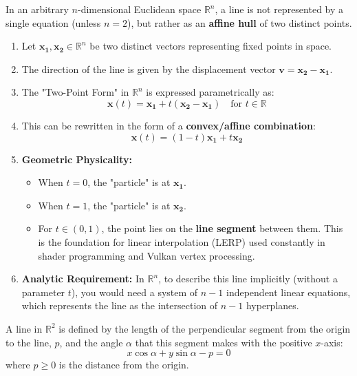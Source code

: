 \begin{remark}
In an arbitrary $n$-dimensional Euclidean space $\mathbb{R}^n$, a line is not represented by a single equation (unless $n=2$), but rather as an \textbf{affine hull} of two distinct points.

\begin{enumerate}
    \item Let $\mathbf{x_1}, \mathbf{x_2} \in \mathbb{R}^n$ be two distinct vectors representing fixed points in space.
    \item The direction of the line is given by the displacement vector $\mathbf{v} = \mathbf{x_2} - \mathbf{x_1}$.
    \item The "Two-Point Form" in $\mathbb{R}^n$ is expressed parametrically as:
    \[ \mathbf{x}(t) = \mathbf{x_1} + t(\mathbf{x_2} - \mathbf{x_1}) \quad \text{for } t \in \mathbb{R} \]
    \item This can be rewritten in the form of a \textbf{convex/affine combination}:
    \[ \mathbf{x}(t) = (1 - t)\mathbf{x_1} + t\mathbf{x_2} \]
    \item \textbf{Geometric Physicality:} 
    \begin{itemize}
        \item When $t=0$, the "particle" is at $\mathbf{x_1}$.
        \item When $t=1$, the "particle" is at $\mathbf{x_2}$.
        \item For $t \in (0, 1)$, the point lies on the \textbf{line segment} between them. This is the foundation for linear interpolation (LERP) used constantly in shader programming and Vulkan vertex processing.
    \end{itemize}
    \item \textbf{Analytic Requirement:} In $\mathbb{R}^n$, to describe this line implicitly (without a parameter $t$), you would need a system of $n-1$ independent linear equations, which represents the line as the intersection of $n-1$ hyperplanes.
\end{enumerate}
\end{remark}









\begin{definition}
A line in $\mathbb{R}^2$ is defined by the length of the perpendicular segment from the origin to the line, $p$, and the angle $\alpha$ that this segment makes with the positive $x$-axis:
\[ x \cos \alpha + y \sin \alpha - p = 0 \]
where $p \ge 0$ is the distance from the origin.
\end{definition}

